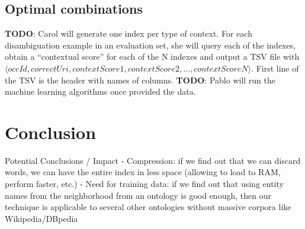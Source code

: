 \documentclass[10pt,a4paper]{article}
\newcommand{\todo}[1]{{\color{red}\textsf{\textbf{TODO}}: #1}}
\begin{document}
\subsection{Optimal combinations}

\todo{Carol will generate one index per type of context. For each disambiguation example in an evaluation set, she will query each of the indexes, obtain a ``contextual score'' for each of the N indexes and output a TSV file with $\langle occId, correctUri, contextScore1, contextScore2, ..., contextScoreN\rangle$. First line of the TSV is the header with names of columns.}
\todo{Pablo will run the machine learning algorithms once provided the data.}

\section{Conclusion}

Potential Conclusions / Impact
- Compression: if we find out that we can discard words, we can have the entire index in less space (allowing to load to RAM, perform faster, etc.)
- Need for training data: if we find out that using entity names from the neighborhood from an ontology is good enough, then our technique is applicable to several other ontologies without massive corpora like Wikipedia/DBpedia



\end{document}
